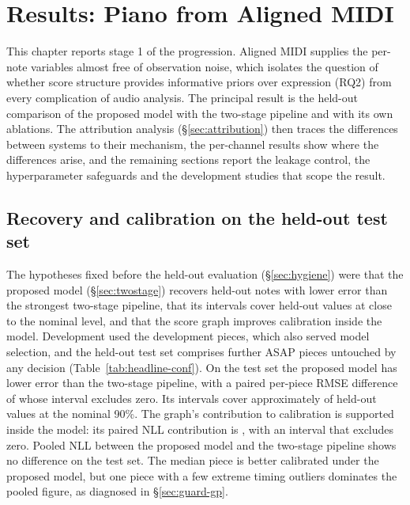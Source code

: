 \chapter{Results: Piano from Aligned MIDI}\label{ch:results}
This chapter reports stage 1 of the progression. Aligned MIDI supplies the
per-note variables almost free of observation noise, which isolates the
question of whether score structure provides informative priors over
expression (RQ2) from every complication of audio analysis. The principal
result is the held-out comparison of the proposed model with the two-stage
pipeline and with its own ablations. The attribution analysis
(\S\ref{sec:attribution}) then traces the differences between systems to
their mechanism, the per-channel results show where the differences arise,
and the remaining sections report the leakage control, the hyperparameter
safeguards and the development studies that scope the result.

\section{Recovery and calibration on the held-out test set}
The hypotheses fixed before the held-out evaluation (\S\ref{sec:hygiene})
were that the proposed model (\S\ref{sec:twostage}) recovers held-out notes
with lower error than the strongest two-stage pipeline, that its intervals
cover held-out values at close to the nominal level, and that the score graph
improves calibration inside the model. Development used the \nPieces{}
development pieces, which also served model selection, and the held-out test
set comprises \nConfPieces{} further ASAP pieces untouched by any decision
(Table~\ref{tab:headline-conf}). On the test set the proposed model has lower
error than the two-stage pipeline, with a paired per-piece RMSE difference of
\dRmseConf{} whose interval excludes zero. Its intervals cover approximately
\covGP{} of held-out values at the nominal 90\%. The graph's contribution to
calibration is supported inside the model: its paired NLL contribution is
\dNllGraphConf{}, with an interval that excludes zero. Pooled NLL between the
proposed model and the two-stage pipeline shows no difference on the test
set. The median piece is better calibrated under the proposed model, but one
piece with a few extreme timing outliers dominates the pooled figure, as
diagnosed in \S\ref{sec:guard-gp}.

